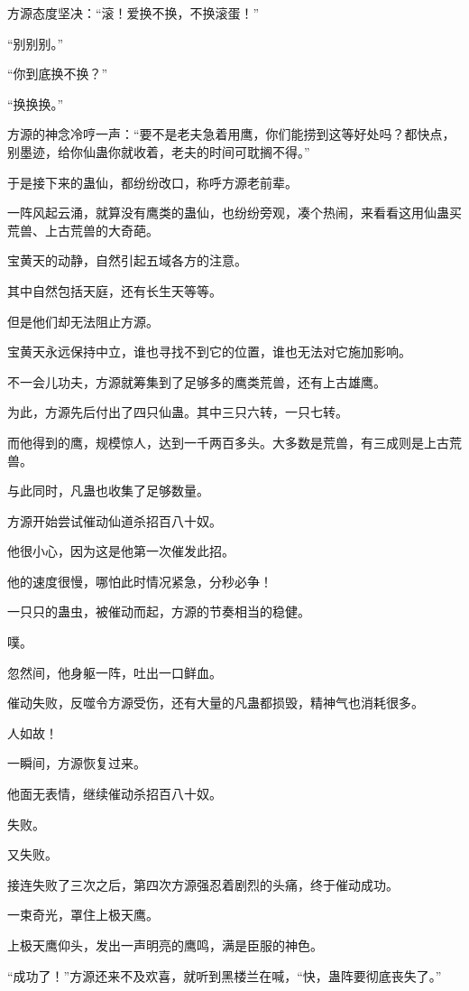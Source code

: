 \begin{this_body}
方源态度坚决：“滚！爱换不换，不换滚蛋！”

“别别别。”

“你到底换不换？”

“换换换。”

方源的神念冷哼一声：“要不是老夫急着用鹰，你们能捞到这等好处吗？都快点，别墨迹，给你仙蛊你就收着，老夫的时间可耽搁不得。”

于是接下来的蛊仙，都纷纷改口，称呼方源老前辈。

一阵风起云涌，就算没有鹰类的蛊仙，也纷纷旁观，凑个热闹，来看看这用仙蛊买荒兽、上古荒兽的大奇葩。

宝黄天的动静，自然引起五域各方的注意。

其中自然包括天庭，还有长生天等等。

但是他们却无法阻止方源。

宝黄天永远保持中立，谁也寻找不到它的位置，谁也无法对它施加影响。

不一会儿功夫，方源就筹集到了足够多的鹰类荒兽，还有上古雄鹰。

为此，方源先后付出了四只仙蛊。其中三只六转，一只七转。

而他得到的鹰，规模惊人，达到一千两百多头。大多数是荒兽，有三成则是上古荒兽。

与此同时，凡蛊也收集了足够数量。

方源开始尝试催动仙道杀招百八十奴。

他很小心，因为这是他第一次催发此招。

他的速度很慢，哪怕此时情况紧急，分秒必争！

一只只的蛊虫，被催动而起，方源的节奏相当的稳健。

噗。

忽然间，他身躯一阵，吐出一口鲜血。

催动失败，反噬令方源受伤，还有大量的凡蛊都损毁，精神气也消耗很多。

人如故！

一瞬间，方源恢复过来。

他面无表情，继续催动杀招百八十奴。

失败。

又失败。

接连失败了三次之后，第四次方源强忍着剧烈的头痛，终于催动成功。

一束奇光，罩住上极天鹰。

上极天鹰仰头，发出一声明亮的鹰鸣，满是臣服的神色。

“成功了！”方源还来不及欢喜，就听到黑楼兰在喊，“快，蛊阵要彻底丧失了。”


\end{this_body}
